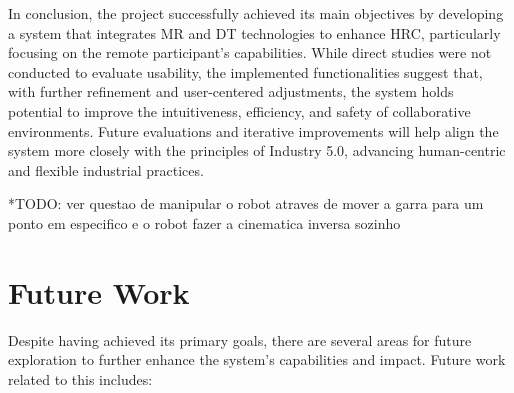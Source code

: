 In conclusion, the project successfully achieved its main objectives by developing a system that integrates \ac{MR} and \ac{DT} technologies to enhance \ac{HRC}, particularly focusing on the remote participant's capabilities. While direct studies were not conducted to evaluate usability, the implemented functionalities suggest that, with further refinement and user-centered adjustments, the system holds potential to improve the intuitiveness, efficiency, and safety of collaborative environments. Future evaluations and iterative improvements will help align the system more closely with the principles of Industry 5.0, advancing human-centric and flexible industrial practices.


*TODO: ver questao de manipular o robot atraves de mover a garra para um ponto em especifico e o robot fazer a cinematica inversa sozinho

\section{Future Work}

Despite having achieved its primary goals, there are several areas for future exploration to further enhance the system's capabilities and impact.
Future work related to this includes:

